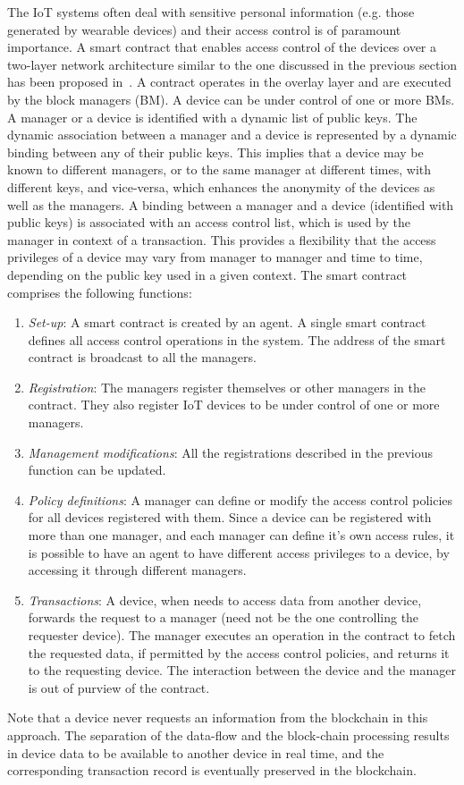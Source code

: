 The IoT systems often deal with sensitive personal information (e.g. those generated by wearable devices) and their access control
is of paramount importance. A smart contract that enables access control of the devices over a two-layer network architecture similar
to the one discussed in the previous section has been proposed in~\citep{Novo:2018}. 
%
A contract operates in the overlay layer and are executed by the block managers (BM). A device can be under control of one or more 
BMs. A manager or a device is identified with a dynamic list of public keys. The dynamic association between a manager and a device 
is represented by a dynamic binding between any of their public keys. This implies that a device may be known to different managers, 
or to the same manager at different times, with different keys, and vice-versa, which enhances the anonymity of the devices as well 
as the managers. A binding between a manager and a device (identified with public keys) is associated with an access control list, 
which is used by the manager in context of a transaction. This provides a flexibility that the access privileges of a device may 
vary from manager to manager and time to time, depending on the public key used in a given context.
%
The smart contract comprises the following functions:
\begin{enumerate}
	\item {\em Set-up}: A smart contract is created by an agent. A single smart contract defines all access control operations
		in the system. The address of the smart contract is broadcast to all the managers.
	\item {\em Registration}: The managers register themselves or other managers in the contract. They also register IoT devices 
		to be under control of one or more managers. 
	\item {\em Management modifications}: All the registrations described in the previous function can be updated.
	\item {\em Policy definitions}: A manager can define or modify the access control policies for all devices registered with them. 
		Since a device can be registered with more than one manager, and each manager can define it's own access rules, 
		it is possible to have an agent to have different access privileges to a device, by accessing it through different 
		managers. 
	\item {\em Transactions}: A device, when needs to access data from another device, forwards the request to a manager (need 
		not be the one controlling the requester device). The manager executes an operation in the contract to fetch the 
		requested data, if permitted by the access control policies, and returns it to the requesting device. The interaction 
		between the device and the manager is out of purview of the contract.
\end{enumerate}

Note that a device never requests an information from the blockchain in this approach. The separation of the data-flow and the 
block-chain processing results in device data to be available to another device in real time, and the corresponding transaction
record is eventually preserved in the blockchain.
